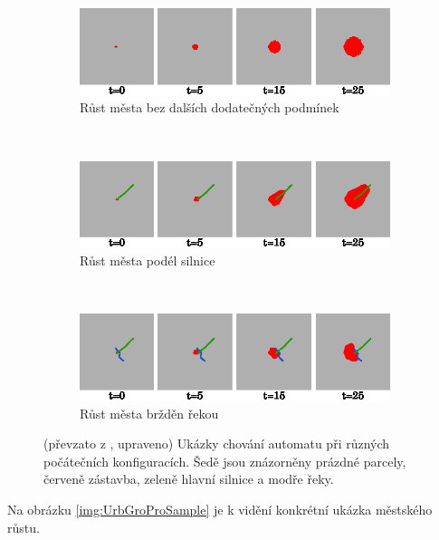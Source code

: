 \documentclass[a4paper,10pt]{article}
\begin{document}
\begin{figure}
    \begin{subfigure}{0.9\textwidth}
      \includegraphics[width=\textwidth]{genimg-urban-growt-transitions-1}
      \caption{Růst města bez dalších dodatečných podmínek} 
    \end{subfigure}
    \\
    \begin{subfigure}{0.9\textwidth}
      \includegraphics[width=\textwidth]{genimg-urban-growt-transitions-2}
      \caption{Růst města podél silnice} 
    \end{subfigure}
    \\
    \begin{subfigure}{0.9\textwidth}
      \includegraphics[width=\textwidth]{genimg-urban-growt-transitions-3}
      \caption{Růst města bržděn řekou} 
    \end{subfigure}

    \caption[Ukázky chování automatu]{(převzato z \cite{LiuPhi-DevCelAutModUrbGroIncFuzSetApp}, upraveno) Ukázky chování automatu při různých počátečních konfiguracích. Šedě jsou znázorněny prázdné parcely, červeně zástavba, zeleně hlavní silnice a modře řeky.} \label{img:VarTransRuls}
\end{figure}

Na obrázku \ref{img:UrbGroProSample} je k vidění konkrétní ukázka městského růstu.
\end{document}
